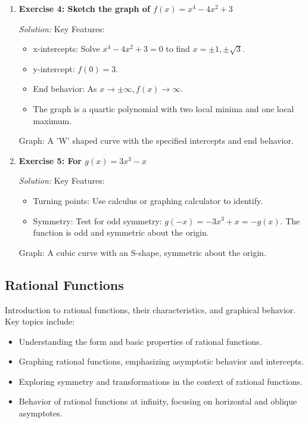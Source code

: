 \documentclass[a4paper,12pt]{book}
\newenvironment{solution}[1][]
{\par\noindent\textit{Solution:} \rmfamily}{\medskip}
\begin{document}
\begin{enumerate}
    \item \textbf{Exercise 4: Sketch the graph of \( f(x) = x^4 - 4x^2 + 3 \)}
    \begin{solution}
    Key Features:
    \begin{itemize}
        \item x-intercepts: Solve \( x^4 - 4x^2 + 3 = 0 \) to find \( x = \pm 1, \pm \sqrt{3} \).
        \item y-intercept: \( f(0) = 3 \).
        \item End behavior: As \( x \rightarrow \pm \infty, f(x) \rightarrow \infty \).
        \item The graph is a quartic polynomial with two local minima and one local maximum.
    \end{itemize}
    Graph: A 'W' shaped curve with the specified intercepts and end behavior.
    \end{solution}

    \item \textbf{Exercise 5: For \( g(x) = 3x^3 - x \)}
    \begin{solution}
    Key Features:
    \begin{itemize}
        \item Turning points: Use calculus or graphing calculator to identify.
        \item Symmetry: Test for odd symmetry: \( g(-x) = -3x^3 + x = -g(x) \). The function is odd and symmetric about the origin.
    \end{itemize}
    Graph: A cubic curve with an S-shape, symmetric about the origin.
    \end{solution}
\end{enumerate}



\subsection{Rational Functions}
\label{subsec:rational_functions}
Introduction to rational functions, their characteristics, and graphical behavior. Key topics include:

\begin{itemize}
    \item Understanding the form and basic properties of rational functions.
    \item Graphing rational functions, emphasizing asymptotic behavior and intercepts.
    \item Exploring symmetry and transformations in the context of rational functions.
    \item Behavior of rational functions at infinity, focusing on horizontal and oblique asymptotes.
\end{itemize}
\end{document}
